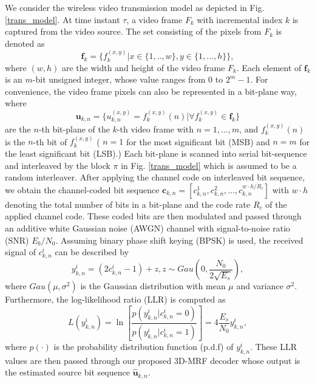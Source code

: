 \documentclass[10pt,twocolumn,twoside]{IEEEtran}
\begin{document}
We consider the wireless video transmission model as depicted in Fig. \ref{trans_model}. At time instant $\tau$, a video frame $F_k$ with incremental index $k$ is captured from the video source. The set consisting of the pixels from $F_k$ is denoted as
\begin{equation}
\mathbf{f}_k = \{f_k^{(x,y)}|x\in\{1,..,w\}, y\in\{1,...,h\}\},
\end{equation} 
where $(w,h)$ are the width and height of the video frame $F_k$. Each element of $\mathbf{f}_k$ is an $m$-bit unsigned integer, whose value ranges from $0$ to $2^m-1$. For convenience, the video frame pixels can also be represented in a bit-plane way, where
\begin{equation}
\mathbf{u}_{k,n} = \{u_{k,n}^{(x,y)} = f_k^{(x,y)}(n) | \forall f_k^{(x,y)} \in \mathbf{f}_k\}
\end{equation} 
are the $n$-th bit-plane of the $k$-th video frame with $n = 1,...,m$, and $f_k^{(x,y)}(n)$ is the $n$-th bit of $f_k^{(x,y)}$ ( $n=1$ for the most significant bit (MSB)  and $n=m$ for the least significant bit (LSB).) Each bit-plane is scanned into serial bit-sequence and interleaved by the block $\pi$ in Fig. \ref{trans_model} which is assumed to be a random interleaver. After applying the channel code on interleaved bit sequence, we obtain the channel-coded bit sequence $\mathbf{c}_{k,n} = [c_{k,n}^1, c_{k,n}^2,...,c_{k,n}^{w\cdot h/R_c}]$ with $w \cdot h$ denoting the total number of bits in a bit-plane and the code rate $R_c$ of the applied channel code. These coded bits are then modulated and passed through an additive white Gaussian noise (AWGN) channel with signal-to-noise ratio (SNR) $E_b/N_0$. Assuming binary phase shift keying (BPSK) is used, the received signal of $c_{k,n}^i$ can be described by
\begin{equation}
y_{k,n}^i = (2c_{k,n}^i - 1) + z, z \sim Gau(0,\frac{N_0}{2\sqrt{E_s}}),
\end{equation}
where $Gau(\mu,\sigma^2)$ is the Gaussian distribution with mean $\mu$ and variance $\sigma^2$. Furthermore, the log-likelihood ratio (LLR) is computed as
\begin{equation}
L(y_{k,n}^i) =\ln[ \frac{p(y_{k,n}^i | c_{k,n}^i = 0)}{p(y_{k,n}^i | c_{k,n}^i = 1)}] = 4\frac{E_s}{N_0}y_{k,n}^i,
\end{equation}
where $p(\cdot)$ is the probability distribution function (p.d.f) of $y_{k,n}^i$. These LLR values are then passed through our proposed 3D-MRF decoder whose output is the estimated source bit sequence $\hat{\mathbf{u}}_{k,n}$.
\end{document}
